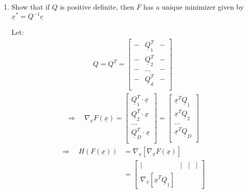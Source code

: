 \documentclass[11pt,letterpaper]{article}
\begin{document}
\begin{tcolorbox}
\begin{flushleft}
\begin{enumerate}
        \item Show that if $Q$ is positive definite, then $F$ has a unique minimizer given by $\underline x^* = Q^{-1} \underline c$
        \begin{flushleft}
            Let:
            \begin{align*}
                Q = Q^T = \begin{bmatrix}
                         - & \underline Q_1^T & -\\
                         - & \underline Q_2^T & -\\
                         - & \dots & -\\
                         - & \underline Q_d^T & -\\
                    \end{bmatrix}
            \end{align*}
            \begin{align*}
                \Rightarrow \quad
                \nabla_{\underline x}F(\underline x) = \begin{bmatrix}
                          \underline Q_1^T \cdot \underline x \\
                          \underline Q_2^T \cdot \underline x  \\
                          \dots \\
                          \underline Q_D^T \cdot \underline x  \\
                    \end{bmatrix}
                = \begin{bmatrix}
                           \underline x^T \underline Q_1\\
                           \underline x^T \underline Q_2 \\
                          \dots \\
                           \underline x^T  \underline Q_D\\
                    \end{bmatrix}
            \end{align*}
            \begin{align*}
                \Rightarrow \quad
                H(F(\underline x)) &= \nabla_{\underline x}[\nabla_{\underline x}F(\underline x)]\\
                &=   \begin{bmatrix}
                         | & | & | & | \\
                         \nabla_{\underline x}[\underline x^T \underline Q_1] & 

\end{bmatrix}
\end{align*}
\end{flushleft}
\end{enumerate}
\end{flushleft}
\end{tcolorbox}
\end{document}
